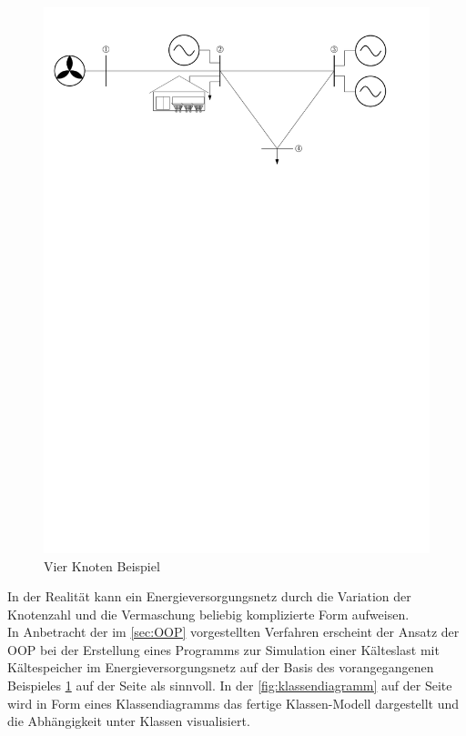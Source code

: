 \begin{figure}[h]
\caption{Vier Knoten Beispiel}
	\label{fig:vkb}
	\begin{center}
	\includegraphics[scale=0.75]{images/SEVN/power_grid}
	\end{center}
\end{figure}

\noindent In der Realität kann ein Energieversorgungsnetz durch die Variation
der Knotenzahl und die Vermaschung beliebig komplizierte Form aufweisen. \\

In Anbetracht der im \cref{sec:OOP} vorgestellten Verfahren erscheint der Ansatz
der OOP bei der Erstellung eines Programms zur Simulation einer K\"alteslast mit
K\"altespeicher im Energieversorgungsnetz auf der Basis des vorangegangenen
Beispieles \cref{fig:vkb} auf der Seite \pageref{fig:vkb} als sinnvoll. In der
\cref{fig:klassendiagramm} auf der Seite \pageref{fig:klassendiagramm} wird in
Form eines Klassendiagramms das fertige Klassen-Modell dargestellt und die
Abh\"angigkeit unter Klassen visualisiert.

